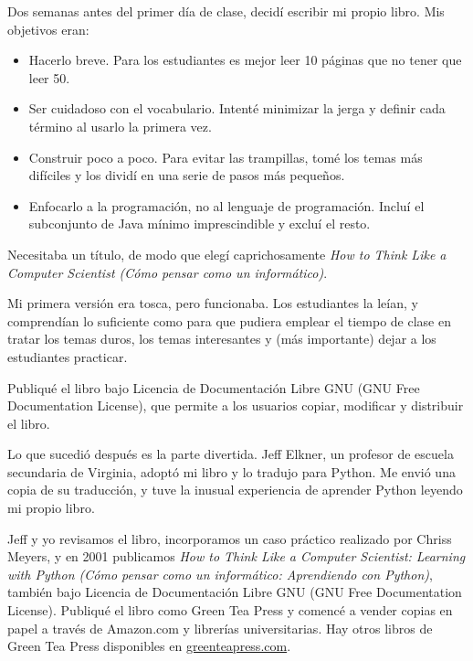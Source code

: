 Dos semanas antes del primer día de clase, decidí escribir mi
propio libro.
Mis objetivos eran:

\begin{itemize}

\item Hacerlo breve. Para los estudiantes es mejor leer 10 páginas
que no tener que leer 50.

\item Ser cuidadoso con el vocabulario. Intenté minimizar la jerga
y definir cada término al usarlo la primera vez.

\item Construir poco a poco. Para evitar las trampillas, tomé los temas
más difíciles y los dividí en una serie de pasos más pequeños.

\item Enfocarlo a la programación, no al lenguaje de programación. Incluí
el subconjunto de Java mínimo imprescindible y excluí el resto.

\end{itemize}

Necesitaba un título, de modo que elegí caprichosamente \emph{How to Think Like
a Computer Scientist (Cómo pensar como un informático)}.

Mi primera versión era tosca, pero funcionaba. Los estudiantes la leían,
y comprendían lo suficiente como para que pudiera emplear el tiempo de clase
en tratar los temas duros, los temas interesantes y (más importante) dejar a los
estudiantes practicar.

Publiqué el libro bajo Licencia de Documentación Libre GNU (GNU Free Documentation License),
que permite a los usuarios copiar, modificar y distribuir el libro.


Lo que sucedió después es la parte divertida. Jeff Elkner, un profesor
de escuela secundaria de Virginia, adoptó mi libro y lo tradujo para
Python. Me envió una copia de su traducción, y tuve la inusual
experiencia de aprender Python leyendo mi propio libro.

Jeff y yo revisamos el libro, incorporamos un caso práctico realizado por
Chriss Meyers, y en 2001 publicamos \emph{How to Think Like
a Computer Scientist: Learning with Python (Cómo pensar como un informático:
Aprendiendo con Python)}, también bajo
Licencia de Documentación Libre GNU (GNU Free Documentation License).
Publiqué el libro como Green Tea Press y comencé a vender
copias en papel a través de Amazon.com y librerías universitarias.
Hay otros libros de Green Tea Press disponibles en
\url{greenteapress.com}.

